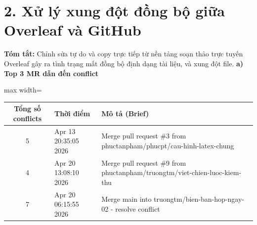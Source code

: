 \documentclass[12pt,a4paper]{article}
\begin{document}
\section*{2. Xử lý xung đột đồng bộ giữa Overleaf và GitHub}
\textbf{Tóm tắt:} Chỉnh sửa tự do và copy trực tiếp từ nền tảng soạn thảo trực tuyến Overleaf gây ra tình trạng mất đồng bộ định dạng tài liệu, và xung đột file.
\textbf{a) Top 3 MR dẫn đến conflict}
\begin{table}[H]
\centering
\renewcommand{\arraystretch}{1.3}
\begin{adjustbox}{max width=\textwidth}
\begin{tabular}{|c|l|p{8.5cm}|}
\hline
\rowcolor{green!10}
\textbf{Tổng số conflicts} & \textbf{Thời điểm} & \textbf{Mô tả (Brief)} \\ \hline
5 & Apr 13 20:35:05 2026 & Merge pull request \#3 from phuctanpham/phucpt/cau-hinh-latex-chung \\ \hline
4 & Apr 20 13:08:10 2026 & Merge pull request \#9 from phuctanpham/truongtm/viet-chien-luoc-kiem-thu \\ \hline
7 & Apr 20 06:15:55 2026 & Merge main into truongtm/bien-ban-hop-ngay-02 - resolve conflict \\ \hline
\end{tabular}
\end{adjustbox}
\end{table}
\end{document}
